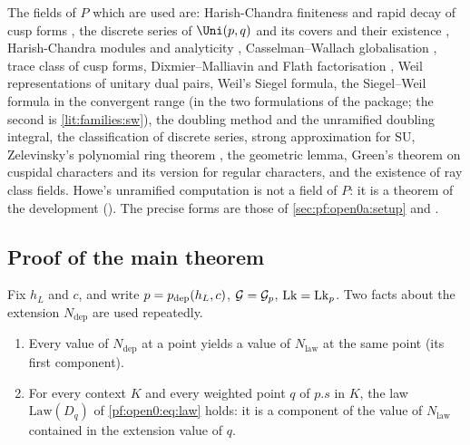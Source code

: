 The fields of $P$ which are used are: Harish-Chandra finiteness and rapid decay of cusp forms \cite{HarishChandra1968}, the
discrete series of $\Uni(p,q)$ and its covers and their existence \cite{HarishChandra1966}, Harish-Chandra modules and analyticity
\cite{HarishChandra1953}, Casselman--Wallach globalisation \cite{Casselman1989,Wallach1992}, trace class of cusp forms,
Dixmier--Malliavin and Flath factorisation \cite{DixmierMalliavin1978,Flath1979}, Weil representations of unitary dual pairs, Weil's
Siegel formula, the Siegel--Weil formula in the convergent range \cite{Siegel1935,Weil1965} (in the two formulations of the package;
the second is \cref{lit:families:sw}), the doubling method and the unramified doubling integral, the classification of discrete
series, strong approximation for $\mathrm{SU}$, Zelevinsky's polynomial ring theorem \cite{Zelevinsky1981}, the geometric lemma,
Green's theorem on cuspidal characters \cite{Green1955} and its version for regular characters, and the existence of ray class
fields. Howe's unramified computation \cite{Howe1979} is not a field of $P$: it is a theorem of the development
().
The precise forms are those of \cref{sec:pf:open0a:setup} and \cite{LeanSource2026}.

\subsection{Proof of the main theorem}\label{sec:pf:open0:assembly}

Fix $h_L$ and $c$, and write $p=p_{\mathrm{dep}}(h_L,c)$, $\mathcal{G}=\mathcal{G}_p$, $\mathrm{Lk}=\mathrm{Lk}_p$. Two
facts about the extension $N_{\mathrm{dep}}$ are used repeatedly.
\begin{enumerate}[label=(L\arabic*)]
\item\label{pf:open0:L1} Every value of $N_{\mathrm{dep}}$ at a point yields a value of $N_{\mathrm{law}}$ at the same point
(its first component).
\item\label{pf:open0:L2} For every context $K$ and every weighted point $q$ of $p.s$ in $K$, the law $\mathrm{Law}(D_q)$ of
\eqref{pf:open0:eq:law} holds: it is a component of the value of $N_{\mathrm{law}}$ contained in the extension value of
$q$.
\end{enumerate}

